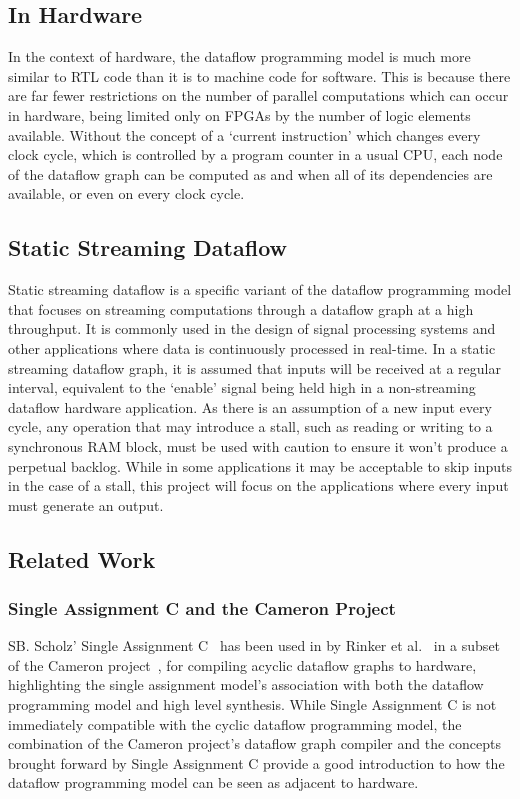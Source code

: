 \subsection{In Hardware}
In the context of hardware, the dataflow programming model is much more similar to RTL code than it is to machine code for software. This is because there are far fewer restrictions on the number of parallel computations which can occur in hardware, being limited only on FPGAs by the number of logic elements available. Without the concept of a `current instruction' which changes every clock cycle, which is controlled by a program counter in a usual CPU, each node of the dataflow graph can be computed as and when all of its dependencies are available, or even on every clock cycle.

\subsection{Static Streaming Dataflow}
Static streaming dataflow is a specific variant of the dataflow programming model that focuses on streaming computations through a dataflow graph at a high throughput. It is commonly used in the design of signal processing systems and other applications where data is continuously processed in real-time. In a static streaming dataflow graph, it is assumed that inputs will be received at a regular interval, equivalent to the `enable' signal being held high in a non-streaming dataflow hardware application. As there is an assumption of a new input every cycle, any operation that may introduce a stall, such as reading or writing to a synchronous RAM block, must be used with caution to ensure it won't produce a perpetual backlog. While in some applications it may be acceptable to skip inputs in the case of a stall, this project will focus on the applications where every input must generate an output.

\subsection{Related Work}
\subsubsection{Single Assignment C and the Cameron Project}
SB. Scholz' Single Assignment C \cite{sa-c} has been used in by Rinker et al. \cite{920828} in a subset of the Cameron project \cite{najjar1998cameron}, for compiling acyclic dataflow graphs to hardware, highlighting the single assignment model's association with both the dataflow programming model and high level synthesis. While Single Assignment C is not immediately compatible with the cyclic dataflow programming model, the combination of the Cameron project's dataflow graph compiler and the concepts brought forward by Single Assignment C provide a good introduction to how the dataflow programming model can be seen as adjacent to hardware.

